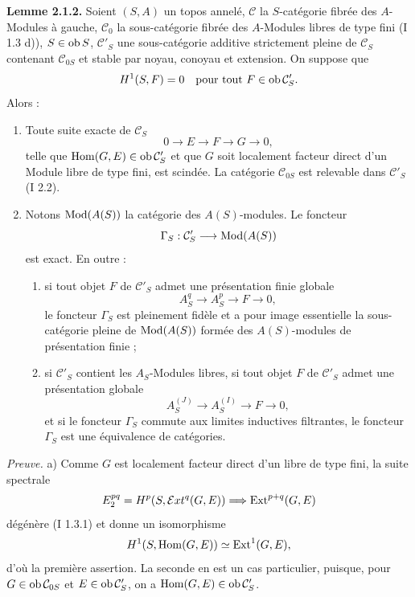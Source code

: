 \documentclass[11pt]{article}
\begin{document}
\textbf{Lemme 2.1.2.} Soient $(S,A)$ un topos annelé, $\mathcal C$ la $S$-catégorie fibrée des $A$-Modules à gauche, $\mathcal C_0$ la sous-catégorie fibrée des $A$-Modules libres de type fini (I 1.3 d)), $S\in\operatorname{ob} S$, $\mathcal C'_S$ une sous-catégorie additive strictement pleine de $\mathcal C_S$ contenant $\mathcal C_{0S}$ et stable par noyau, conoyau et extension. On suppose que
\[
H^1(S,F)=0\quad\text{pour tout }F\in\operatorname{ob}\mathcal C'_S.
\]
Alors :
\begin{enumerate}[label=\alph*)]
\item Toute suite exacte de $\mathcal C_S$
\[
0\longrightarrow E\longrightarrow F\longrightarrow G\longrightarrow0,
\]
telle que $\operatorname{Hom}(G,E)
\in\operatorname{ob}\mathcal C'_S$ et que $G$ soit localement facteur direct d'un Module libre de type fini, est scindée. La catégorie $\mathcal C_{0S}$ est relevable dans $\mathcal C'_S$ (I 2.2).
\item Notons $\operatorname{Mod}(A(S))$ la catégorie des $A(S)$-modules. Le foncteur
\[
\Gamma_S:\mathcal C'_S\longrightarrow\operatorname{Mod}(A(S))
\]
est exact. En outre :
\begin{enumerate}[label=(\roman*)]
\item si tout objet $F$ de $\mathcal C'_S$ admet une présentation finie globale
\[
A_S^q\longrightarrow A_S^p\longrightarrow F\longrightarrow0,
\]
le foncteur $\Gamma_S$ est pleinement fidèle et a pour image essentielle la sous-catégorie pleine de $\operatorname{Mod}(A(S))$ formée des $A(S)$-modules de présentation finie ;
\item si $\mathcal C'_S$ contient les $A_S$-Modules libres, si tout objet $F$ de $\mathcal C'_S$ admet une présentation globale
\[
A_S^{(J)}\longrightarrow A_S^{(I)}\longrightarrow F\longrightarrow0,
\]
et si le foncteur $\Gamma_S$ commute aux limites inductives filtrantes, le foncteur $\Gamma_S$ est une équivalence de catégories.
\end{enumerate}
\end{enumerate}

\emph{Preuve.} a) Comme $G$ est localement facteur direct d'un libre de type fini, la suite spectrale
\[
E_2^{pq}=H^p(S,\mathcal{E}xt^q(G,E))\Longrightarrow\operatorname{Ext}^{p+q}(G,E)
\]
dégénère (I 1.3.1) et donne un isomorphisme
\[
H^1(S,\operatorname{Hom}(G,E))\simeq\operatorname{Ext}^1(G,E),
\]
d'où la première assertion. La seconde en est un cas particulier, puisque, pour $G\in\operatorname{ob}\mathcal C_{0S}$ et $E\in\operatorname{ob}\mathcal C'_S$, on a $\operatorname{Hom}(G,E)\in\operatorname{ob}\mathcal C'_S$.
\end{document}
